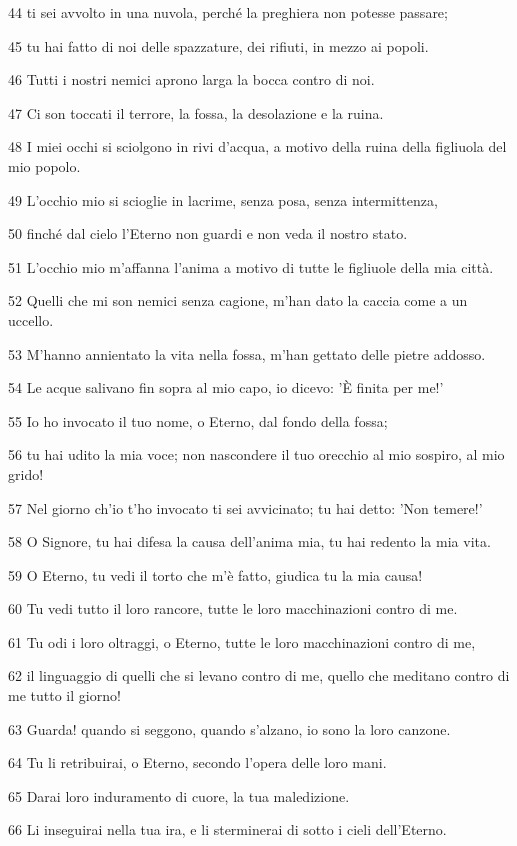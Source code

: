 \par 44 ti sei avvolto in una nuvola, perché la preghiera non potesse passare;
\par 45 tu hai fatto di noi delle spazzature, dei rifiuti, in mezzo ai popoli.
\par 46 Tutti i nostri nemici aprono larga la bocca contro di noi.
\par 47 Ci son toccati il terrore, la fossa, la desolazione e la ruina.
\par 48 I miei occhi si sciolgono in rivi d'acqua, a motivo della ruina della figliuola del mio popolo.
\par 49 L'occhio mio si scioglie in lacrime, senza posa, senza intermittenza,
\par 50 finché dal cielo l'Eterno non guardi e non veda il nostro stato.
\par 51 L'occhio mio m'affanna l'anima a motivo di tutte le figliuole della mia città.
\par 52 Quelli che mi son nemici senza cagione, m'han dato la caccia come a un uccello.
\par 53 M'hanno annientato la vita nella fossa, m'han gettato delle pietre addosso.
\par 54 Le acque salivano fin sopra al mio capo, io dicevo: 'È finita per me!'
\par 55 Io ho invocato il tuo nome, o Eterno, dal fondo della fossa;
\par 56 tu hai udito la mia voce; non nascondere il tuo orecchio al mio sospiro, al mio grido!
\par 57 Nel giorno ch'io t'ho invocato ti sei avvicinato; tu hai detto: 'Non temere!'
\par 58 O Signore, tu hai difesa la causa dell'anima mia, tu hai redento la mia vita.
\par 59 O Eterno, tu vedi il torto che m'è fatto, giudica tu la mia causa!
\par 60 Tu vedi tutto il loro rancore, tutte le loro macchinazioni contro di me.
\par 61 Tu odi i loro oltraggi, o Eterno, tutte le loro macchinazioni contro di me,
\par 62 il linguaggio di quelli che si levano contro di me, quello che meditano contro di me tutto il giorno!
\par 63 Guarda! quando si seggono, quando s'alzano, io sono la loro canzone.
\par 64 Tu li retribuirai, o Eterno, secondo l'opera delle loro mani.
\par 65 Darai loro induramento di cuore, la tua maledizione.
\par 66 Li inseguirai nella tua ira, e li sterminerai di sotto i cieli dell'Eterno.

